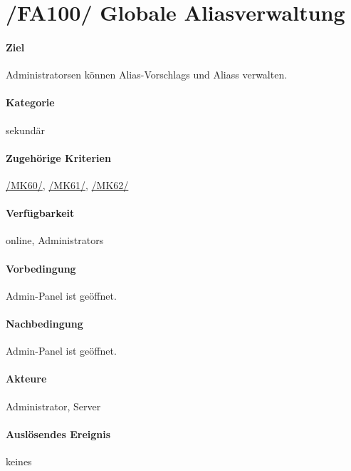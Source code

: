 \section[Globale Aliasverwaltung]{/FA100/ Globale Aliasverwaltung}
\label{/FA100/}
\paragraph{Ziel}
\Glspl{Administrator}en können \Glspl{Alias-Vorschlag} und  \Glspl{Alias} verwalten.
\paragraph{Kategorie}
sekundär
\paragraph{Zugehörige Kriterien}
\hyperref[/MK60/]{/MK60/}, \hyperref[/MK61/]{/MK61/}, \hyperref[/MK62/]{/MK62/}
\paragraph{Verfügbarkeit}
online, \Glspl{Administrator}
\paragraph{Vorbedingung}
\Gls{Admin-Panel} ist geöffnet.
\paragraph{Nachbedingung}
\Gls{Admin-Panel} ist geöffnet.
\paragraph{Akteure}
\Gls{Administrator}, \Gls{Server}
\paragraph{Auslösendes Ereignis}
keines
